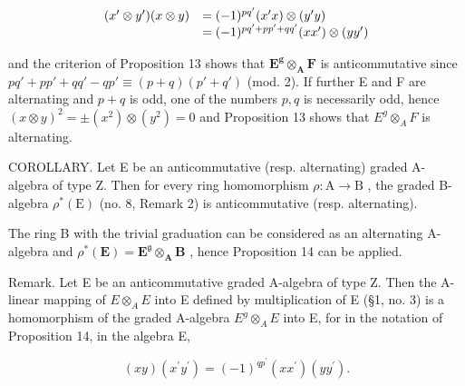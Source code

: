 \[
\begin{array}{r l} (x ^ {\prime} \otimes y ^ {\prime}) (x \otimes y) & = (- 1) ^ {p q ^ {\prime}} (x ^ {\prime} x) \otimes (y ^ {\prime} y) \\ & = (- 1) ^ {p q ^ {\prime} + p p ^ {\prime} + q q ^ {\prime}} (x x ^ {\prime}) \otimes (y y ^ {\prime}) \end{array}
\]

and the criterion of Proposition 13 shows that \(\mathbf{E}^{\mathbf{g}}\otimes_{\mathbf{A}}\mathbf{F}\) is anticommutative since \(pq' + p p' + qq' - q p' \equiv (p + q)(p' + q')\) (mod. 2). If further E and F are alternating and \(p + q\) is odd, one of the numbers \(p, q\) is necessarily odd, hence \((x \otimes y)^2 = \pm (x^2) \otimes (y^2) = 0\) and Proposition 13 shows that \(E^g \otimes_A F\) is alternating.

COROLLARY. Let E be an anticommutative (resp. alternating) graded A-algebra of type Z. Then for every ring homomorphism \(\rho: \mathrm{A} \to \mathrm{B}\) , the graded B-algebra \(\rho^{*}(\mathrm{E})\) (no. 8, Remark 2) is anticommutative (resp. alternating).

The ring B with the trivial graduation can be considered as an alternating A-algebra and \(\rho^{*}(\mathbf{E}) = \mathbf{E}^{\mathfrak{g}}\otimes_{\mathbf{A}}\mathbf{B}\) , hence Proposition 14 can be applied.

Remark. Let E be an anticommutative graded A-algebra of type Z. Then the A-linear mapping of \(E \otimes_{A} E\) into E defined by multiplication of E (§1, no. 3) is a homomorphism of the graded A-algebra \(E^{g} \otimes_{A} E\) into E, for in the notation of Proposition 14, in the algebra E,

\[
(x y) (x ^ {\prime} y ^ {\prime}) = (- 1) ^ {q p ^ {\prime}} (x x ^ {\prime}) (y y ^ {\prime}).
\]

